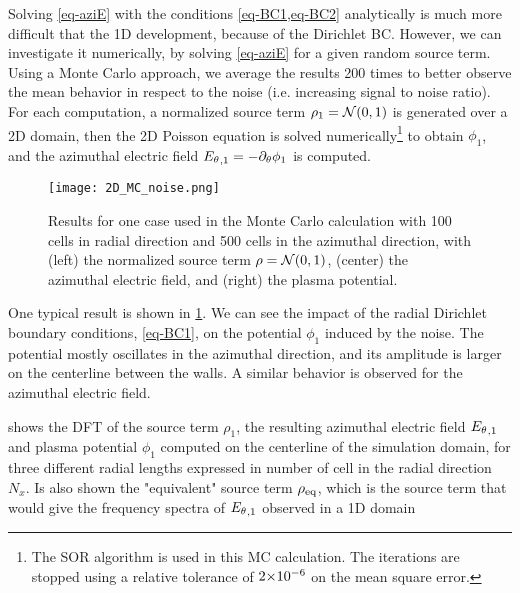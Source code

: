       Solving \cref{eq-aziE} with the conditions \cref{eq-BC1,eq-BC2} analytically is much more difficult that the \ac{1D} development, because of the Dirichlet \ac{BC}.
      However, we can investigate it numerically, by solving \cref{eq-aziE} for a given random source term.
      Using a Monte Carlo approach, we average the results  200 times to better observe the mean behavior in respect to the noise (i.e. increasing signal to noise ratio).
      For each computation, a normalized source term $\rho_1 = \mathcal{N}(0, 1)$ is generated over a \ac{2D} domain, then the \ac{2D} Poisson equation is solved numerically\footnote{The SOR algorithm is used in this MC calculation. The iterations are stopped using a relative tolerance of ${{2}{\times}10^{-6}}$ on the mean square error.} to obtain $\phi_1$, and the azimuthal electric field ${E_{\theta}}_{, 1} =- \partial_{\theta} \phi_1 $ is computed.
    
      \begin{figure}[hbt]
        \centering
        \texttt{[image: 2D\_MC\_noise.png]}
        \caption{Results for one case used in the Monte Carlo calculation with 100 cells in radial direction and 500 cells in the azimuthal direction, with (left) the normalized source term $\rho = \mathcal{N}(0, 1)$, (center) the azimuthal electric field, and (right) the plasma potential. }
        \label{fig-one}
      \end{figure}
      
      One typical result is shown in \cref{fig-one}.
      We can see the impact of the radial Dirichlet boundary conditions, \cref{eq-BC1}, on the potential $\phi_1$ induced by the noise.
      The potential mostly oscillates in the azimuthal direction, and its amplitude is larger on the centerline between the walls.
      A similar behavior is observed for the azimuthal electric field.      
      
       shows the \ac{DFT} of the source term $\rho_1$, the resulting azimuthal electric field ${E_{\theta}}_{, 1}$ and plasma potential $\phi_1$ computed on the centerline of the simulation domain, for three different radial lengths expressed in number of cell in the radial direction $N_x$.
      Is also shown the "equivalent" source term $\rho_{\rm eq}$, which is the source term that would give the frequency spectra of ${E_{\theta}}_{, 1}$ observed in a \ac{1D} domain
      
